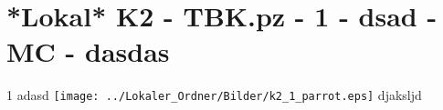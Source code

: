 \section{*Lokal* K2 - TBK.pz - 1 - dsad - MC - dasdas}

\begin{langesbeispiel} \item[1] %
adasd \texttt{[image: ../Lokaler\_Ordner/Bilder/k2\_1\_parrot.eps]} djaksljd
\end{langesbeispiel}